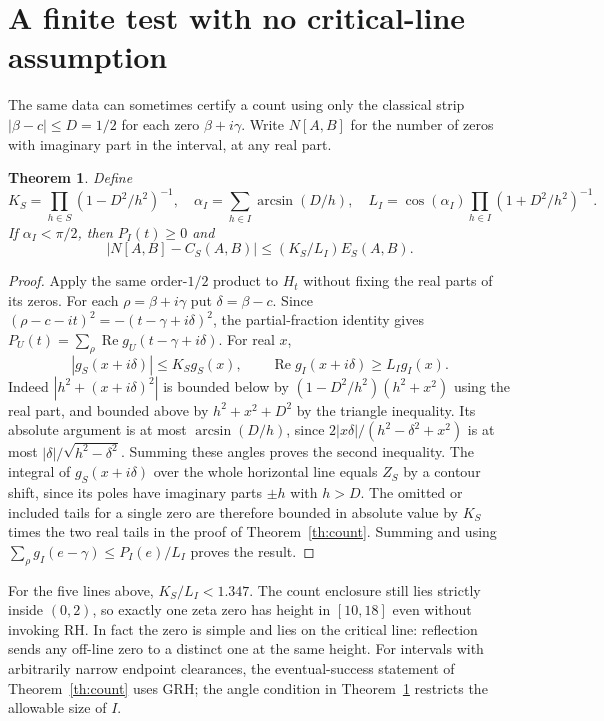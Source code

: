 \documentclass[11pt]{article}
\newtheorem{theorem}{Theorem}
\newcommand{\Real}{\operatorname{Re}}
\begin{document}
\section{A finite test with no critical-line assumption}
The same data can sometimes certify a count using only the classical strip
$|\beta-c|\le D=1/2$ for each zero $\beta+i\gamma$. Write $N[A,B]$ for
the number of zeros with imaginary part in the interval, at any real part.
\begin{theorem}\label{th:strip}
Define
\[
 K_S=\prod_{h\in S}(1-D^2/h^2)^{-1},\quad
 \alpha_I=\sum_{h\in I}\arcsin(D/h),\quad
 L_I=\cos(\alpha_I)\prod_{h\in I}(1+D^2/h^2)^{-1}.
\]
If $\alpha_I<\pi/2$, then $P_I(t)\ge0$ and
\[
             |N[A,B]-C_S(A,B)|\le (K_S/L_I)E_S(A,B).
\]
\end{theorem}
\begin{proof}
Apply the same order-$1/2$ product to $H_t$ without fixing the real parts of
its zeros. For each $\rho=\beta+i\gamma$ put $\delta=\beta-c$.
Since $(\rho-c-it)^2=-(t-\gamma+i\delta)^2$, the partial-fraction identity gives
$P_U(t)=\sum_\rho\Real g_U(t-\gamma+i\delta)$. For real $x$,
\[
 |g_S(x+i\delta)|\le K_S g_S(x),\qquad
 \Real g_I(x+i\delta)\ge L_I g_I(x).
\]
Indeed $|h^2+(x+i\delta)^2|$ is bounded below by
$(1-D^2/h^2)(h^2+x^2)$ using the real part, and bounded above by
$h^2+x^2+D^2$ by the triangle inequality. Its absolute argument is at most
$\arcsin(D/h)$, since $2|x\delta|/(h^2-\delta^2+x^2)$ is at most
$|\delta|/\sqrt{h^2-\delta^2}$. Summing these angles proves the second
inequality. The integral of $g_S(x+i\delta)$ over the whole horizontal
line equals $Z_S$ by a contour shift, since its poles have imaginary parts
$\pm h$ with $h>D$. The omitted or included tails for a single zero are
therefore bounded in absolute value by $K_S$ times the two real tails in
the proof of Theorem~\ref{th:count}. Summing and using
$\sum_\rho g_I(e-\gamma)\le P_I(e)/L_I$ proves the result.
\end{proof}
For the five lines above, $K_S/L_I<1.347$. The count enclosure still lies
strictly inside $(0,2)$, so exactly one zeta zero has height in $[10,18]$
even without invoking RH. In fact the zero is simple and lies on the
critical line: reflection sends any off-line zero to a distinct one at the
same height. For intervals with arbitrarily narrow endpoint clearances,
the eventual-success statement of Theorem~\ref{th:count} uses GRH; the angle
condition in Theorem~\ref{th:strip} restricts the allowable size of $I$.
\end{document}
